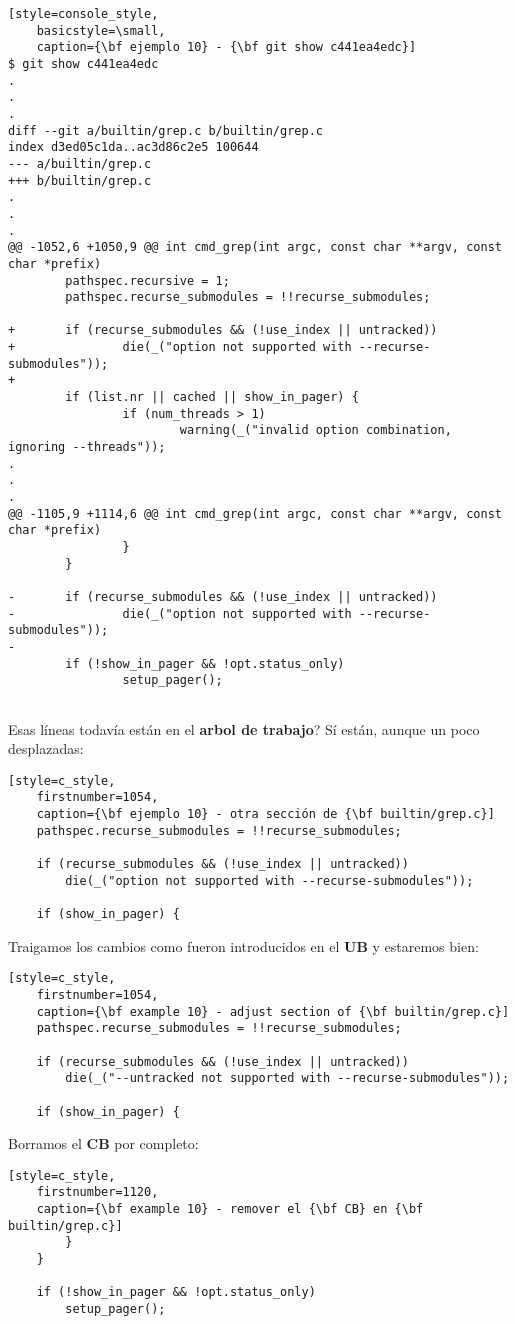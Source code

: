 \begin{lstlisting}[style=console_style,
	basicstyle=\small,
	caption={\bf ejemplo 10} - {\bf git show c441ea4edc}]
$ git show c441ea4edc
.
.
.
diff --git a/builtin/grep.c b/builtin/grep.c
index d3ed05c1da..ac3d86c2e5 100644
--- a/builtin/grep.c
+++ b/builtin/grep.c
.
.
.
@@ -1052,6 +1050,9 @@ int cmd_grep(int argc, const char **argv, const char *prefix)
        pathspec.recursive = 1;
        pathspec.recurse_submodules = !!recurse_submodules;
 
+       if (recurse_submodules && (!use_index || untracked))
+               die(_("option not supported with --recurse-submodules"));
+
        if (list.nr || cached || show_in_pager) {
                if (num_threads > 1)
                        warning(_("invalid option combination, ignoring --threads"));
.
.
.
@@ -1105,9 +1114,6 @@ int cmd_grep(int argc, const char **argv, const char *prefix)
                }
        }
 
-       if (recurse_submodules && (!use_index || untracked))
-               die(_("option not supported with --recurse-submodules"));
-
        if (!show_in_pager && !opt.status_only)
                setup_pager();
 
\end{lstlisting}

Esas líneas todavía están en el {\bf arbol de trabajo}? Sí están, aunque un poco desplazadas:
\begin{lstlisting}[style=c_style,
	firstnumber=1054,
	caption={\bf ejemplo 10} - otra sección de {\bf builtin/grep.c}]
	pathspec.recurse_submodules = !!recurse_submodules;

	if (recurse_submodules && (!use_index || untracked))
		die(_("option not supported with --recurse-submodules"));

	if (show_in_pager) {
\end{lstlisting}

Traigamos los cambios como fueron introducidos en el {\bf UB} y estaremos bien:
\begin{lstlisting}[style=c_style,
	firstnumber=1054,
	caption={\bf example 10} - adjust section of {\bf builtin/grep.c}]
	pathspec.recurse_submodules = !!recurse_submodules;

	if (recurse_submodules && (!use_index || untracked))
		die(_("--untracked not supported with --recurse-submodules"));

	if (show_in_pager) {
\end{lstlisting}


Borramos el {\bf CB} por completo:
\begin{lstlisting}[style=c_style,
	firstnumber=1120,
	caption={\bf example 10} - remover el {\bf CB} en {\bf builtin/grep.c}]
		}
	}

	if (!show_in_pager && !opt.status_only)
		setup_pager();
\end{lstlisting}

